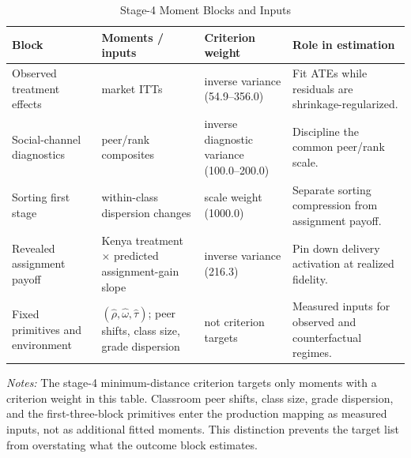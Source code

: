 \begin{table}[H]
\centering
\caption{Stage-4 Moment Blocks and Inputs}
\label{tab:struct_target_blocks}
\begin{threeparttable}
\footnotesize
\begin{tabular}[t]{>{\raggedright\arraybackslash}p{2.6cm}>{\raggedright\arraybackslash}p{3.5cm}>{\raggedright\arraybackslash}p{2.8cm}>{\raggedright\arraybackslash}p{4.7cm}}
\toprule
Block & Moments / inputs & Criterion weight & Role in estimation \\
\midrule
Observed treatment effects & 3 market ITTs & inverse variance (54.9--356.0) & Fit ATEs while residuals are shrinkage-regularized. \\
Social-channel diagnostics & 3 peer/rank composites & inverse diagnostic variance (100.0--200.0) & Discipline the common peer/rank scale. \\
Sorting first stage & 3 within-class dispersion changes & scale weight (1000.0) & Separate sorting compression from assignment payoff. \\
Revealed assignment payoff & Kenya treatment $\times$ predicted assignment-gain slope & inverse variance (216.3) & Pin down delivery activation at realized fidelity. \\
Fixed primitives and environment & $(\hat{\rho},\hat{\omega},\hat{\tau})$; peer shifts, class size, grade dispersion & not criterion targets & Measured inputs for observed and counterfactual regimes. \\
\bottomrule
\end{tabular}
\begin{tablenotes}
\footnotesize
\item \textit{Notes:} The stage-4 minimum-distance criterion targets only moments with a criterion weight in this table. Classroom peer shifts, class size, grade dispersion, and the first-three-block primitives enter the production mapping as measured inputs, not as additional fitted moments. This distinction prevents the target list from overstating what the outcome block estimates.
\end{tablenotes}
\end{threeparttable}
\end{table}
